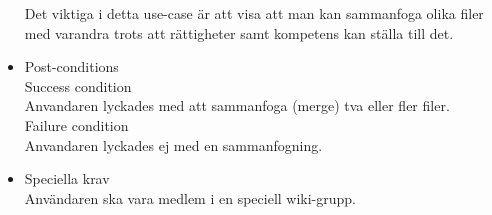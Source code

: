 \begin{itemize}
	Det viktiga i detta use-case är att visa att man kan sammanfoga olika filer med varandra trots att rättigheter samt kompetens kan ställa till det.
	\item Post-conditions	
		\\Success condition 
		\\Anvandaren lyckades med att sammanfoga (merge) tva eller fler filer.
		\\Failure condition
		\\Anvandaren lyckades ej med en sammanfogning.
		
	\item Speciella krav
	\\Användaren ska vara medlem i en speciell wiki-grupp.
\end{itemize}


